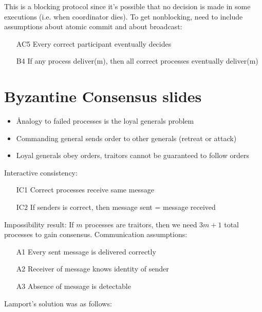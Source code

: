 \documentclass[a4paper,10pt,]{article}
\begin{document}
This is a blocking protocol since it's possible that no decision is made in some executions (i.e. when coordinator dies).  To get nonblocking, need to include assumptions about atomic commit and about broadcast:
\begin{itemize}
  \item[AC5] Every correct participant eventually decides
  \item[B4] If any process deliver(m), then all correct processes eventually deliver(m)
\end{itemize}

\section{Byzantine Consensus slides}
\begin{itemize}
  \item Ånalogy to failed processes is the loyal generals problem
  \item Commanding general sends order to other generals (retreat or attack)
  \item Loyal generals obey orders, traitors cannot be guaranteed to follow orders
\end{itemize}
Interactive consistency:
\begin{itemize}
  \item[IC1] Correct processes receive same message
  \item[IC2] If senders is correct, then message sent = message received
\end{itemize}
Impossibility result: If $m$ processes are traitors, then we need $3m+1$ total processes to gain consensus.
Communication assumptions:
\begin{itemize}
  \item[A1] Every sent message is delivered correctly
  \item[A2] Receiver of message knows identity of sender
  \item[A3] Absence of message is detectable
\end{itemize}
Lamport's solution was as follows:
\end{document}
